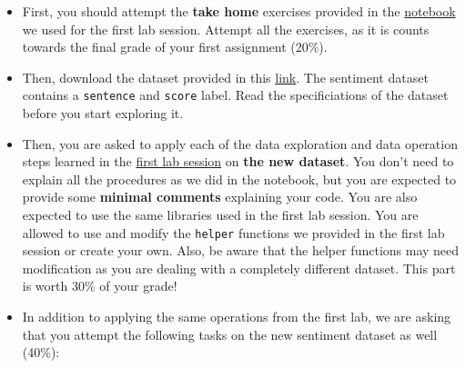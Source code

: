 \documentclass[11pt]{article}
\begin{document}
    \begin{itemize}
\item
  First, you should attempt the \textbf{take home} exercises provided in
  the
  \href{https://github.com/omarsar/data_mining_lab/blob/master/news_data_mining.ipynb}{notebook}
  we used for the first lab session. Attempt all the exercises, as it is
  counts towards the final grade of your first assignment (20\%).
\item
  Then, download the dataset provided in this
  \href{https://archive.ics.uci.edu/ml/datasets/Sentiment+Labelled+Sentences\#}{link}.
  The sentiment dataset contains a \texttt{sentence} and \texttt{score}
  label. Read the specificiations of the dataset before you start
  exploring it.
\item
  Then, you are asked to apply each of the data exploration and data
  operation steps learned in the
  \href{https://github.com/omarsar/data_mining_lab}{first lab session}
  on \textbf{the new dataset}. You don't need to explain all the
  procedures as we did in the notebook, but you are expected to provide
  some \textbf{minimal comments} explaining your code. You are also
  expected to use the same libraries used in the first lab session. You
  are allowed to use and modify the \texttt{helper} functions we
  provided in the first lab session or create your own. Also, be aware
  that the helper functions may need modification as you are dealing
  with a completely different dataset. This part is worth 30\% of your
  grade!
\item
  In addition to applying the same operations from the first lab, we are
  asking that you attempt the following tasks on the new sentiment
  dataset as well (40\%):


\end{itemize}
\end{document}
